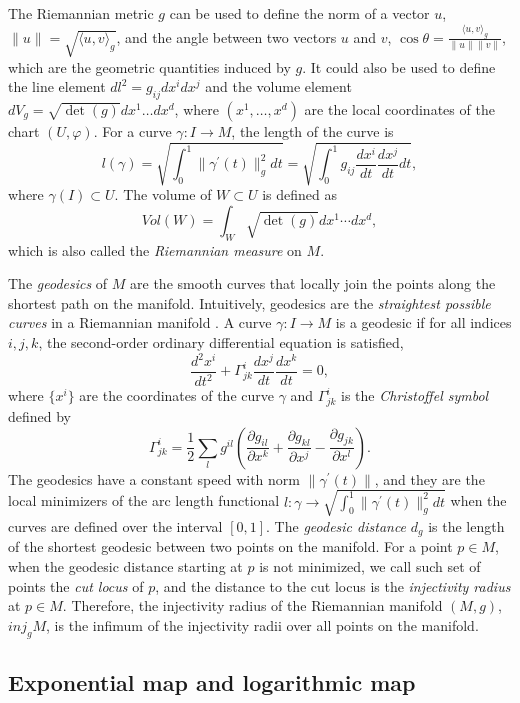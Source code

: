 \documentclass[12pt]{article}
\begin{document}
The Riemannian metric \(g\) can be used to define the norm of a vector \(u\), \(\|u\| = \sqrt{\langle u,v \rangle_g}\), and the angle between two vectors \(u\) and \(v\), \(\cos\theta = \frac{\langle u,v \rangle_g}{\|u\| \|v\|}\), which are the geometric quantities induced by \(g\). It could also be used to define the line element \(dl^2 = g_{ij}dx^i dx^j\) and the volume element \(dV_g = \sqrt{\det(g)}dx^1 \dots dx^d\), where \((x^1,\dots,x^d)\) are the local coordinates of the chart \((U, \varphi)\).
For a curve \(\gamma: I \rightarrow M\), the length of the curve is
\[
l(\gamma) = \sqrt{\int_0^1 \|\gamma^\prime(t)\|^2_g dt} = \sqrt{\int_0^1 g_{ij} \frac{dx^i}{dt} \frac{dx^j}{dt} dt},
\]
where \(\gamma(I) \subset U\). The volume of \(W \subset U\) is defined as
\[
Vol(W) = \int_W \sqrt{\det(g)}dx^1 \cdots dx^d,
\]
which is also called the \emph{Riemannian measure} on \(M\).

The \emph{geodesics} of \(M\) are the smooth curves that locally join the points along the shortest path on the manifold. Intuitively, geodesics are the \emph{straightest possible curves} in a Riemannian manifold \autocite[Section 7.2.3 of][]{Nakahara2018-zs}.
A curve \(\gamma: I \rightarrow M\) is a geodesic if for all indices \(i,j,k\), the second-order ordinary differential equation is satisfied,
\[
\frac{d^2 x^i}{dt^2} + \Gamma^i_{jk} \frac{d x^j}{dt} \frac{dx^k}{dt} = 0,
\]
where \(\{x^i\}\) are the coordinates of the curve \(\gamma\) and \(\Gamma^i_{jk}\) is the \emph{Christoffel symbol} defined by
\[
\Gamma^i_{jk} = \frac{1}{2} \sum_l g^{il} (\frac{\partial g_{il}}{\partial x^k}
+ \frac{\partial g_{kl}}{\partial x^j} - \frac{\partial g_{jk}}{\partial x^l}).
\]
The geodesics have a constant speed with norm \(\| \gamma^\prime(t) \|\), and they are the local minimizers of the arc
length functional \(l:\gamma \rightarrow \sqrt{\int_0^1 \| \gamma^\prime(t) \|_g^2 dt}\) when the curves are defined over the interval \([0,1]\).
The \emph{geodesic distance} \(d_g\) is the length of the shortest geodesic between two points on the manifold. For a point \(p \in M\), when the geodesic distance starting at \(p\) is not minimized, we call such set of points the \emph{cut locus} of \(p\), and the distance to the cut locus is the \emph{injectivity radius} at \(p \in M\). Therefore, the injectivity radius of the Riemannian manifold \((M,g)\), \(\textit{inj}_gM\), is the infimum of the injectivity radii over all points on the manifold.

\hypertarget{exponential-map-and-logarithmic-map}{%
\subsection{Exponential map and logarithmic map}\label{exponential-map-and-logarithmic-map}}
\end{document}
